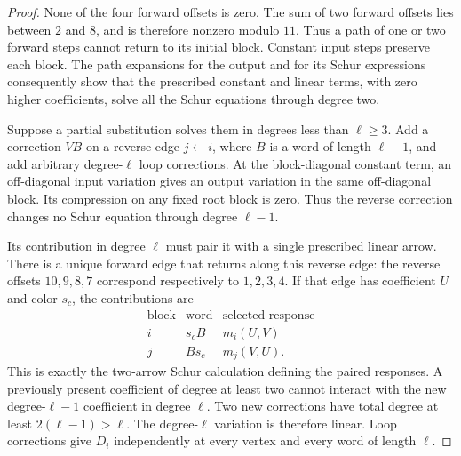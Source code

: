 \begin{proof}
None of the four forward offsets is zero.  The sum of two forward offsets
lies between $2$ and $8$, and is therefore nonzero modulo $11$.
Thus a path of one or two forward steps cannot return to its initial block.
Constant input steps preserve each block.  The path expansions for the
output and for its Schur expressions consequently show that the prescribed
constant and linear terms, with zero higher coefficients, solve all the
Schur equations through degree two.

Suppose a partial substitution solves them in degrees less than
$\ell\ge3$.  Add a correction $V B$ on a reverse edge $j\leftarrow i$,
where $B$ is a word of length $\ell-1$, and add arbitrary degree-$\ell$
loop corrections.  At the block-diagonal constant term, an off-diagonal
input variation gives an output variation in the same off-diagonal block.
Its compression on any fixed root block is zero.  Thus the reverse
correction changes no Schur equation through degree $\ell-1$.

Its contribution in degree $\ell$ must pair it with a single prescribed
linear arrow.  There is a unique forward edge that returns along this
reverse edge: the reverse offsets $10,9,8,7$ correspond respectively to
$1,2,3,4$.  If that edge has coefficient $U$ and color $s_c$, the
contributions are
\begin{equation}
 \begin{array}{c|c|c}
 \text{block}&\text{word}&\text{selected response}\\ \hline
 i&s_cB&m_i(U,V)\\
 j&Bs_c&m_j(V,U).
 \end{array}
 \label{eq:correction-leading-pair}
\end{equation}
This is exactly the two-arrow Schur calculation defining the paired
responses.  A previously present coefficient of degree at least two
cannot interact with the new degree-$\ell-1$ coefficient in degree
$\ell$.  Two new corrections have total degree at least
$2(\ell-1)>\ell$.  The degree-$\ell$ variation is therefore linear.
Loop corrections give $D_i$ independently at every vertex and every
word of length $\ell$.


\end{proof}
